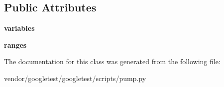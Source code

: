\subsection*{Public Attributes}
\begin{DoxyCompactItemize}
\item 
\mbox{\label{classpump_1_1_env_aba6456f3d0d23ac92bc9508c1b966bcd}} 
{\bfseries variables}
\item 
\mbox{\label{classpump_1_1_env_a8d5fec087c1a9108de9b105922b34309}} 
{\bfseries ranges}
\end{DoxyCompactItemize}


The documentation for this class was generated from the following file\+:\begin{DoxyCompactItemize}
\item 
vendor/googletest/googletest/scripts/pump.\+py\end{DoxyCompactItemize}
